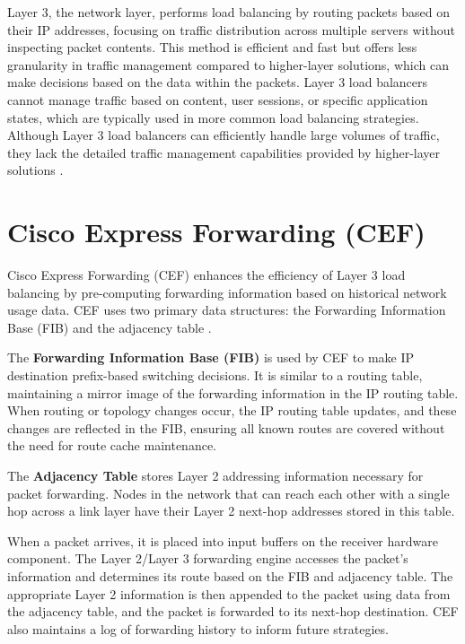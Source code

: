 \documentclass[12pt]{cwru_thesis}
\begin{document}
Layer 3, the network layer, performs load balancing by routing packets based on their IP addresses, focusing on traffic distribution across multiple servers without inspecting packet contents. This method is efficient and fast but offers less granularity in traffic management compared to higher-layer solutions, which can make decisions based on the data within the packets. Layer 3 load balancers cannot manage traffic based on content, user sessions, or specific application states, which are typically used in more common load balancing strategies. Although Layer 3 load balancers can efficiently handle large volumes of traffic, they lack the detailed traffic management capabilities provided by higher-layer solutions \cite{zhang}.

\section{Cisco Express Forwarding (CEF)}

Cisco Express Forwarding (CEF) enhances the efficiency of Layer 3 load balancing by pre-computing forwarding information based on historical network usage data. CEF uses two primary data structures: the Forwarding Information Base (FIB) and the adjacency table \cite{cisco2017cef}.

The \textbf{Forwarding Information Base (FIB)} is used by CEF to make IP destination prefix-based switching decisions. It is similar to a routing table, maintaining a mirror image of the forwarding information in the IP routing table. When routing or topology changes occur, the IP routing table updates, and these changes are reflected in the FIB, ensuring all known routes are covered without the need for route cache maintenance.

The \textbf{Adjacency Table} stores Layer 2 addressing information necessary for packet forwarding. Nodes in the network that can reach each other with a single hop across a link layer have their Layer 2 next-hop addresses stored in this table. 

When a packet arrives, it is placed into input buffers on the receiver hardware component. The Layer 2/Layer 3 forwarding engine accesses the packet's information and determines its route based on the FIB and adjacency table. The appropriate Layer 2 information is then appended to the packet using data from the adjacency table, and the packet is forwarded to its next-hop destination. CEF also maintains a log of forwarding history to inform future strategies.
\end{document}
